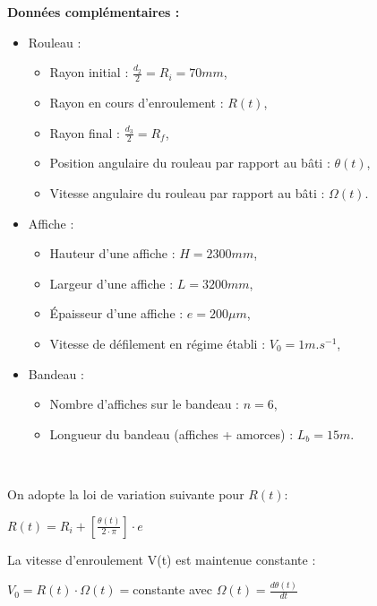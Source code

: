 \newpage

\textbf{Données complémentaires :}
\begin{itemize}
 \item Rouleau :
\begin{itemize}
 \item Rayon initial : $\frac{d_2}{2}=R_i=70 mm$,
 \item Rayon en cours d'enroulement : $R(t)$,
 \item Rayon final : $\frac{d_3}{2}=R_f$,
 \item Position angulaire du rouleau par rapport au bâti : $\theta(t)$,
 \item Vitesse angulaire du rouleau par rapport au bâti : $\Omega(t)$.
\end{itemize} 
 \item Affiche :
\begin{itemize}
 \item Hauteur d'une affiche : $H=2300 mm$,
 \item Largeur d'une affiche : $L=3200 mm$,
 \item Épaisseur d'une affiche : $e=200 \mu m$,
 \item Vitesse de défilement en régime établi : $V_0=1 m.s^{-1}$,
\end{itemize}
 \item Bandeau :
\begin{itemize}
 \item Nombre d'affiches sur le bandeau : $n=6$,
 \item Longueur du bandeau (affiches + amorces) : $L_b=15m$. 
\end{itemize}
\end{itemize}

~\

On adopte la loi de variation suivante pour $R(t)$:\\
\begin{center}
$R(t)=R_i+\left[\frac{\theta(t)}{2\cdot\pi}\right]\cdot e$
\end{center}

La vitesse d'enroulement V(t) est maintenue constante :\\
\begin{center}
$V_0=R(t)\cdot\Omega(t)=$constante avec $\Omega(t)=\frac{d\theta(t)}{dt}$
\end{center}

~\


